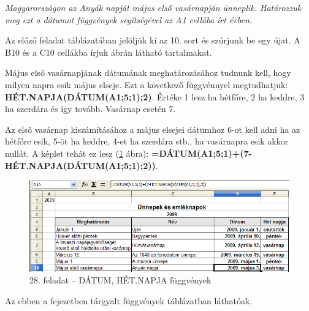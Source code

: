 {\itshape
Magyarországon az Anyák napját május első vasárnapján
ünneplik. Határozzuk meg ezt a dátumot függvények
segítségével az A1 cellába írt évben.}

Az előző feladat táblázatában jelöljük ki az 10. sort
és szúrjunk be egy újat. A B10 és a C10 cellákba írjuk
 ábrán látható tartalmakat.

Május első vasárnapjának dátumának meghatározásához
tudnunk kell, hogy milyen napra esik május elseje. Ezt a
következő függvénnyel megtudhatjuk:
{\sffamily\textbf{HÉT.NAPJA(DÁTUM(A1;5;1);2)}}.
Értéke 1 lesz ha hétfőre, 2 ha keddre, 3 ha szerdára és
így tovább. Vasárnap esetén 7.

Az első vasárnap kiszámításához a május elsejei
dátumhoz 6-ot kell adni ha az hétfőre esik, 5-öt ha keddre,
4-et ha szerdára stb., ha vasárnapra esik akkor nullát. A
képlet tehát ez lesz (\ref{28-feladatDATE} ábra):
{\sffamily\textbf{=DÁTUM(A1;5;1)+(7-HÉT.NAPJA(DÁTUM(A1;5;1);2))}}.

\begin{figure}[!h]
\begin{center}
\includegraphics[width=15.999cm]{oocalcv2-img124.png}
\caption{28. feladat -- DÁTUM, HÉT.NAPJA függvények}\label{28-feladatDATE}
\end{center}
\end{figure}

Az ebben a fejezetben tárgyalt függvények 
táblázatban láthatóak.

